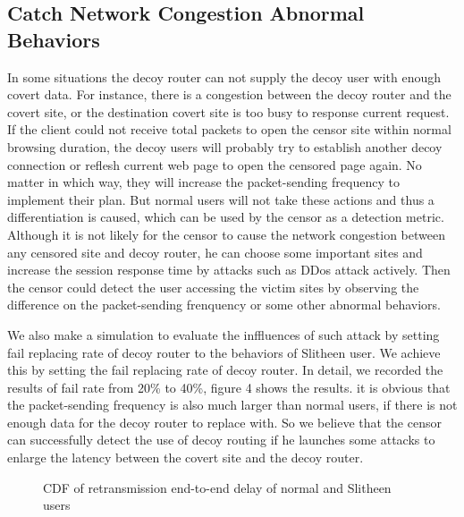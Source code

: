 \documentclass[conference]{IEEEtran}
\begin{document}
\subsection{Catch Network Congestion Abnormal Behaviors}
In some situations the decoy router can not supply the decoy user with enough covert data. For instance, there is a congestion between the decoy router and the covert site, or the destination covert site is too busy to response current request. If the client could not receive total packets to open the censor site within normal browsing duration, the decoy users will probably try to establish another decoy connection or reflesh current web page to open the censored page again. No matter in which way, they will increase the packet-sending frequency to implement their plan. But normal users will not take these actions and thus a differentiation is caused, which can be used by the censor as a detection metric. Although it is not likely for the censor to cause the network congestion between any censored site and decoy router, he can choose some important sites and increase the session response time by attacks such as DDos attack actively. Then the censor could detect the user accessing the victim sites by observing the difference on the packet-sending frenquency or some other abnormal behaviors. 

We also make a simulation to evaluate the inffluences of such attack by setting fail replacing rate of decoy router to the behaviors of Slitheen user. We achieve this by setting the fail replacing rate of decoy router. In detail, we recorded the results of fail rate from 20\% to 40\%, figure 4 shows the results. it is obvious that the packet-sending frequency is also much larger than normal users, if there is not enough data for the decoy router to replace with. So we believe that the censor can successfully detect the use of decoy routing if he launches some attacks to enlarge the latency between the covert site and the decoy router.

 \begin{figure}[htbp]
 	\centering
 	\caption{CDF of retransmission end-to-end delay of normal and Slitheen users}
 	\label{fig.lable}
 \end{figure}
\end{document}
